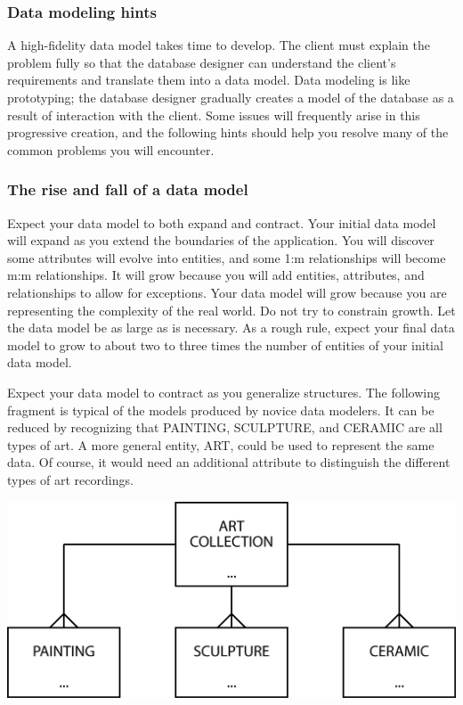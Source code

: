 \documentclass[
]{article}
\begin{document}
\hypertarget{data-modeling-hints}{%
\subsubsection*{Data modeling hints}\label{data-modeling-hints}}

A high-fidelity data model takes time to develop. The client must
explain the problem fully so that the database designer can understand
the client's requirements and translate them into a data model. Data
modeling is like prototyping; the database designer gradually creates a
model of the database as a result of interaction with the client. Some
issues will frequently arise in this progressive creation, and the
following hints should help you resolve many of the common problems you
will encounter.

\hypertarget{the-rise-and-fall-of-a-data-model}{%
\subsubsection*{The rise and fall of a data model}\label{the-rise-and-fall-of-a-data-model}}

Expect your data model to both expand and contract. Your initial data
model will expand as you extend the boundaries of the application. You
will discover some attributes will evolve into entities, and some 1:m
relationships will become m:m relationships. It will grow because you
will add entities, attributes, and relationships to allow for
exceptions. Your data model will grow because you are representing the
complexity of the real world. Do not try to constrain growth. Let the
data model be as large as is necessary. As a rough rule, expect your
final data model to grow to about two to three times the number of
entities of your initial data model.

Expect your data model to contract as you generalize structures. The
following fragment is typical of the models produced by novice data
modelers. It can be reduced by recognizing that PAINTING, SCULPTURE, and
CERAMIC are all types of art. A more general entity, ART, could be used
to represent the same data. Of course, it would need an additional
attribute to distinguish the different types of art recordings.

\includegraphics{Figures/Chapter 7/art collection.png}
\end{document}
